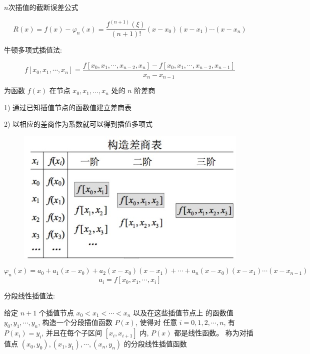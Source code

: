 \documentclass[UTF8]{ctexart}
\begin{document}
$n$次插值的截断误差公式

$$
R(x)=f(x)-\varphi_{n}(x)=\frac{f^{(n+1)}(\xi)}{(n+1) !}\left(x-x_{0}\right)\left(x-x_{1}
\right) \cdots\left(x-x_{n}\right)
$$

\quad

牛顿多项式插值法:

$$
f\left[x_{0}, x_{1}, \cdots, x_{n}\right]=\frac{f\left[x_{0}, x_{1}, \cdots, x_{n-2}, x_{n}\right]-f\left[x_{0}, x_{1}, \cdots, x_{n-2}, x_{n-1}\right]}{x_{n}-x_{n-1}}
$$

为函数 $f(x)$ 在节点 $x_{0}, x_{1}, \ldots, x_{n}$ 处的 $n$ 阶差商

1) 通过已知插值节点的函数值建立差商表

2) 以相应的差商作为系数就可以得到插值多项式

\begin{figure}[h]
    \centering
    \begin{minipage}[t]{0.4\linewidth}
    \includegraphics[width=\linewidth]{chashangbiao.jpg}
    \end{minipage}%
\end{figure}
$$
\varphi_{n}(x)=a_{0}+a_{1}\left(x-x_{0}\right)+a_{2}\left(x-x_{0}\right)\left(x-x_{1}\right)+
\cdots+a_{n}\left(x-x_{0}\right)\left(x-x_{1}\right) \cdots\left(x-x_{n-1}\right)
$$
$$a_{i} = f[x_0,x_1,\cdots,x_i]$$

\quad

分段线性插值法:

给定 $n+1$ 个插值节点 $x_{0}<x_{1}<\cdots<x_{n}$ 
以及在这些插值节点上 的函数值 $y_{0}, y_{1}, \cdots, y_{n}$, 构造一个分段插值函数 $P(x)$, 
使得对 任意 $i=0,1,2, \cdots, n$, 有 $P\left(x_{i}\right)=y_{i}$, 
并且在每个子区间 $\left[x_{i}, x_{i+1}\right]$ 内, $P(x)$ 都是线性函数。
称为对插值点 $\left(x_{0}, y_{0}\right),\left(x_{1}, y_{1}\right), \cdots,\left(x_{n}, y_{n}\right)$ 的分段线性插值函数
\end{document}
